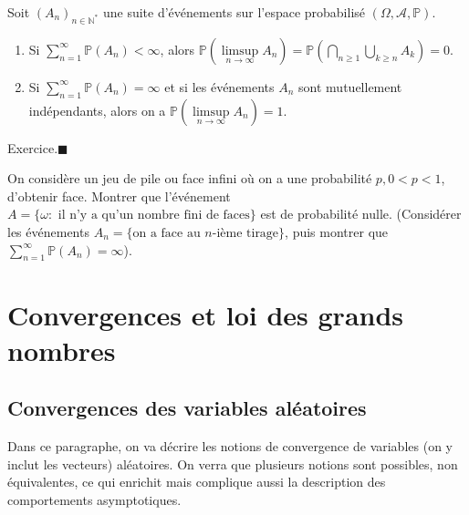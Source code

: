 \begin{lemme}\label{IV-BC}

Soit \((A_n)_{n\in\mathbb{N}^\ast}\) une suite d'événements sur l'espace
probabilisé \((\Omega,\mathcal{A}, \mathbb{P})\).

\begin{enumerate}
\def\labelenumi{\arabic{enumi}.}
\item
  Si \(\sum_{n=1}^{\infty} \mathbb{P}(A_n) < \infty\), alors
  \(\mathbb{P}(\limsup\limits_{n \to \infty} A_n) = \mathbb{P}\left(\bigcap_{n\geq 1} \bigcup_{k \geq n} A_k \right) =0\).
\item
  Si \(\sum_{n=1}^{\infty} \mathbb{P}(A_n) = \infty\) et si les
  événements \(A_n\) sont mutuellement indépendants, alors on a
  \(\mathbb{P}(\limsup\limits_{n \to \infty} A_n) = 1\).
\end{enumerate}
\end{lemme}

\begin{preuve}
Exercice.\hfill$\blacksquare$
\end{preuve}

\label{IV-pf}
On considère un jeu de pile ou face infini où on a une probabilité
\(p, 0< p < 1\), d'obtenir face. Montrer que l'événement
\(A = \{\omega : \text{ il n'y a qu'un nombre fini de faces}\}\) est de
probabilité nulle. (Considérer les événements
\(A_n = \{\text{on a face au }n\text{-ième tirage}\}\), puis montrer que
\(\sum_{n=1}^\infty \mathbb{P}(A_n) = \infty\)).

\chapter{Convergences et loi des grands
nombres}\label{IV-convergences-et-loi-des-grands-nombres}

\section{Convergences des variables
aléatoires}\label{IV-convergences-des-variables-aluxe9atoires}

Dans ce paragraphe, on va décrire les notions de convergence de
variables (on y inclut les vecteurs) aléatoires. On verra que plusieurs
notions sont possibles, non équivalentes, ce qui enrichit mais complique
aussi la description des comportements asymptotiques.

